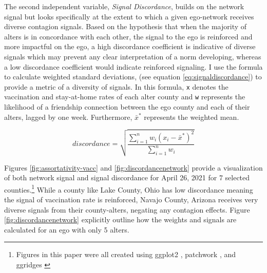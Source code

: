 The second independent variable, \emph{Signal Discordance}, builds on the network
signal but looks specifically at the extent to which a given ego-network
receives diverse contagion signals. Based on the hypothesis that when the
majority of alters is in concordance with each other, the signal to the ego is
reinforced and more impactful on the ego, a high discordance coefficient is
indicative of diverse signals which may prevent any clear interpretation of a
norm developing, whereas a low discordance coefficient would indicate reinforced
signaling. I use the formula to calculate weighted standard deviations, (see equation
\eqref{eq:signaldiscordance}) to provide a metric of a diversity of signals. In
this formula, \texttt{x} denotes the vaccination and stay-at-home rates of each alter
county and \texttt{w} represents the likelihood of a friendship connection between the
ego county and each of their alters, lagged by one week. Furthermore, \(\bar{x}^*\)
represents the weighted mean.

\begin{equation}
discordance = \sqrt{\frac{\sum_{i=1}^nw_i(x_i-\bar{x}^*)^2}{\sum^n_{i=1}w_i}} \label{eq:signaldiscordance}
\end{equation}

Figures \ref{fig:assortativity-vacc} and \ref{fig:discordancenetwork} provide
a visualization of both network signal and signal discordance for April 26, 2021
for 7 selected counties.\footnote{Figures in this paper were all created using ggplot2
\citep{wickham_etal, wickham11}, patchwork \citep{pedersen20}, and ggridges \citep{ggridges}}
While a county like Lake County, Ohio has low discordance meaning the signal of
vaccination rate is reinforced, Navajo County, Arizona receives very diverse
signals from their county-alters, negating any contagion effects. Figure
\ref{fig:discordancenetwork} explicitly outline how the weights and signals are
calculated for an ego with only 5 alters.

